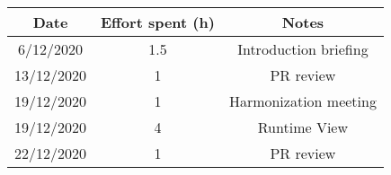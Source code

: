 \documentclass[../../main.tex]{subfiles}
\begin{document}
\begin{center}
    \begin{tabular}{|c| |c| |c|} 
        \hline
        Date & Effort spent (h) & Notes\\ [0.5ex] 
        \hline\hline
        6/12/2020 & 1.5 & Introduction briefing\\ 
        13/12/2020 & 1 & PR review\\
        19/12/2020 & 1 & Harmonization meeting\\
        19/12/2020 & 4 & Runtime View\\
        22/12/2020 & 1 & PR review\\
        \hline
    \end{tabular}
\end{center}
\end{document}
